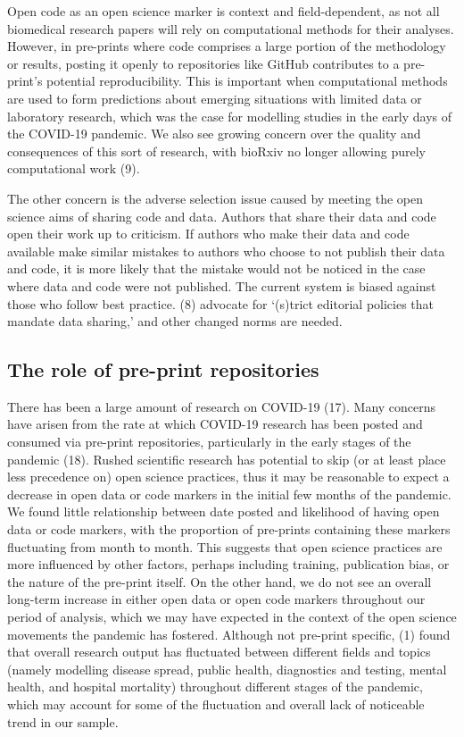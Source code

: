 \documentclass[
]{article}
\begin{document}
Open code as an open science marker is context and field-dependent, as not all biomedical research papers will rely on computational methods for their analyses. However, in pre-prints where code comprises a large portion of the methodology or results, posting it openly to repositories like GitHub contributes to a pre-print's potential reproducibility. This is important when computational methods are used to form predictions about emerging situations with limited data or laboratory research, which was the case for modelling studies in the early days of the COVID-19 pandemic. We also see growing concern over the quality and consequences of this sort of research, with bioRxiv no longer allowing purely computational work (9).

The other concern is the adverse selection issue caused by meeting the open science aims of sharing code and data. Authors that share their data and code open their work up to criticism. If authors who make their data and code available make similar mistakes to authors who choose to not publish their data and code, it is more likely that the mistake would not be noticed in the case where data and code were not published. The current system is biased against those who follow best practice. (8) advocate for `(s)trict editorial policies that mandate data sharing,' and other changed norms are needed.

\hypertarget{the-role-of-pre-print-repositories}{%
\subsection{The role of pre-print repositories}\label{the-role-of-pre-print-repositories}}

There has been a large amount of research on COVID-19 (17). Many concerns have arisen from the rate at which COVID-19 research has been posted and consumed via pre-print repositories, particularly in the early stages of the pandemic (18). Rushed scientific research has potential to skip (or at least place less precedence on) open science practices, thus it may be reasonable to expect a decrease in open data or code markers in the initial few months of the pandemic. We found little relationship between date posted and likelihood of having open data or code markers, with the proportion of pre-prints containing these markers fluctuating from month to month. This suggests that open science practices are more influenced by other factors, perhaps including training, publication bias, or the nature of the pre-print itself. On the other hand, we do not see an overall long-term increase in either open data or open code markers throughout our period of analysis, which we may have expected in the context of the open science movements the pandemic has fostered. Although not pre-print specific, (1) found that overall research output has fluctuated between different fields and topics (namely modelling disease spread, public health, diagnostics and testing, mental health, and hospital mortality) throughout different stages of the pandemic, which may account for some of the fluctuation and overall lack of noticeable trend in our sample.
\end{document}
